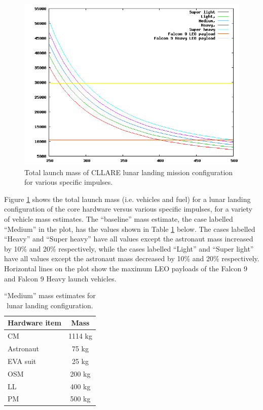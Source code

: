 \documentclass{report}
\begin{document}
\begin{figure}[h] \label{fig:fuel_analysis}
\includegraphics[scale=0.6]{images/fuel_analysis}
\caption{Total launch mass of CLLARE lunar landing mission configuration for various specific impulses.}
\end{figure}

Figure \ref{fig:fuel_analysis} shows the total launch mass (i.e. vehicles and fuel) for a lunar landing configuration of the core hardware versus various specific impulses, for a variety of vehicle mass estimates.  The ``baseline'' mass estimate, the case labelled ``Medium'' in the plot, has the values shown in Table \ref{tab:fuel_analysis} below.  The cases labelled ``Heavy'' and ``Super heavy'' have all values except the astronaut mass increased by 10\% and 20\% respectively, while the cases labelled ``Light'' and ``Super light'' have all values except the astronaut mass decreased by 10\% and 20\% respectively.  Horizontal lines on the plot show the maximum LEO payloads of the Falcon 9 and Falcon 9 Heavy launch vehicles.

\begin{table} \label{tab:fuel_analysis}
\centering
\caption{``Medium'' mass estimates for lunar landing configuration.}
\begin{tabular}{ | l | c | }
\hline
\textbf{Hardware item} & \textbf{Mass} \\
\hline
\hline
CM		& 1114 kg \\
\hline
Astronaut	& 75 kg \\
\hline
EVA suit	& 25 kg \\
\hline
OSM		& 200 kg \\
\hline
LL		& 400 kg \\
\hline
PM		& 500 kg \\
\hline
\end{tabular}
\end{table}
\end{document}
